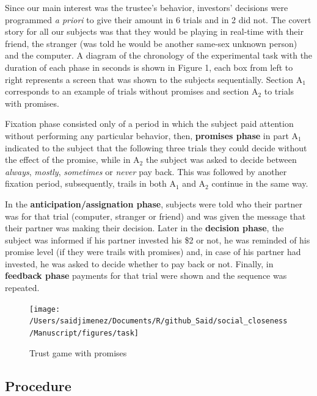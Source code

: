 \documentclass[12pt,]{article}
\begin{document}
Since our main interest was the trustee's behavior, investors' decisions
were programmed \emph{a priori} to give their amount in 6 trials and in
2 did not. The covert story for all our subjects was that they would be
playing in real-time with their friend, the stranger (was told he would
be another same-sex unknown person) and the computer. A diagram of the
chronology of the experimental task with the duration of each phase in
seconds is shown in Figure 1, each box from left to right represents a
screen that was shown to the subjects sequentially. Section A\(_1\)
corresponds to an example of trials without promises and section A\(_2\)
to trials with promises.

Fixation phase consisted only of a period in which the subject paid
attention without performing any particular behavior, then,
\textbf{promises phase} in part A\(_1\) indicated to the subject that
the following three trials they could decide without the effect of the
promise, while in A\(_2\) the subject was asked to decide between
\emph{always}, \emph{mostly}, \emph{sometimes} or \emph{never} pay back.
This was followed by another fixation period, subsequently, trails in
both A\(_1\) and A\(_2\) continue in the same way.

In the \textbf{anticipation/assignation phase}, subjects were told who
their partner was for that trial (computer, stranger or friend) and was
given the message that their partner was making their decision. Later in
the \textbf{decision phase}, the subject was informed if his partner
invested his \$2 or not, he was reminded of his promise level (if they
were trails with promises) and, in case of his partner had invested, he
was asked to decide whether to pay back or not. Finally, in
\textbf{feedback phase} payments for that trial were shown and the
sequence was repeated.

\begin{figure}

{\centering \texttt{[image: /Users/saidjimenez/Documents/R/github\_Said/social\_closeness/Manuscript/figures/task]} 

}

\caption{Trust game with promises}\label{fig:figA}
\end{figure}

\hypertarget{procedure}{%
\subsection{Procedure}\label{procedure}}
\end{document}
